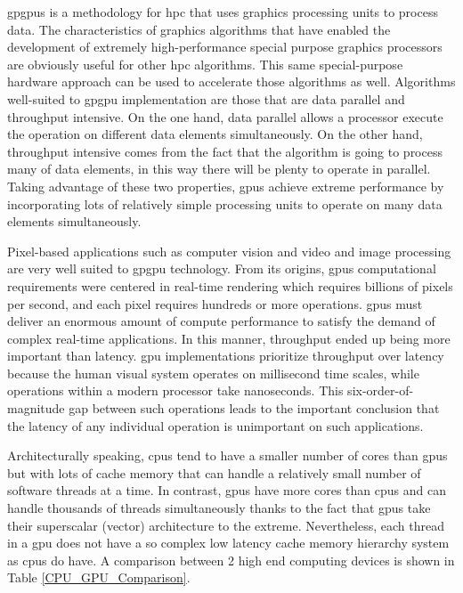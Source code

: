 \documentclass[11pt,a4paper]{article}
\begin{document}
\glspl{gpgpu} is a methodology for \gls{hpc} that uses graphics processing units to process data. The characteristics of graphics algorithms that have enabled the development of extremely high-performance special purpose graphics processors are obviously useful for other \gls{hpc} algorithms. This same special-purpose hardware approach can be used to accelerate those algorithms as well. Algorithms well-suited to \gls{gpgpu} implementation are those that are data parallel and throughput intensive. On the one hand, data parallel allows a processor execute the operation on different data elements simultaneously. On the other hand, throughput intensive comes from the fact that the algorithm is going to process many of data elements, in this way there will be plenty to operate in parallel. Taking advantage of these two properties, \glspl{gpu} achieve extreme performance by incorporating lots of relatively simple processing units to operate on many data elements simultaneously.

Pixel-based applications such as computer vision and video and image processing are very well suited to \gls{gpgpu} technology. From its origins, \glspl{gpu} computational requirements were centered in real-time rendering which requires billions of pixels per second, and each pixel requires hundreds or more operations. \glspl{gpu} must deliver an enormous amount of compute performance to satisfy the demand of complex real-time applications. In this manner, throughput ended up being more important than latency. \gls{gpu} implementations prioritize throughput over latency because the human visual system operates on millisecond time scales, while operations within a modern processor take nanoseconds. This six-order-of-magnitude gap between such operations leads to the important conclusion that the latency of any individual operation is unimportant on such applications.

Architecturally speaking, \glspl{cpu} tend to have a smaller number of cores than \glspl{gpu} but with lots of cache memory that can handle a relatively small number of software threads at a time. In contrast, \glspl{gpu} have more cores than \glspl{cpu} and can handle thousands of threads simultaneously thanks to the fact that \glspl{gpu} take their superscalar (vector) architecture to the extreme. Nevertheless, each thread in a \gls{gpu} does not have a so complex low latency cache memory hierarchy system as \glspl{cpu} do have. A comparison between 2 high end computing devices is shown in Table \ref{CPU_GPU_Comparison}. 
\end{document}
